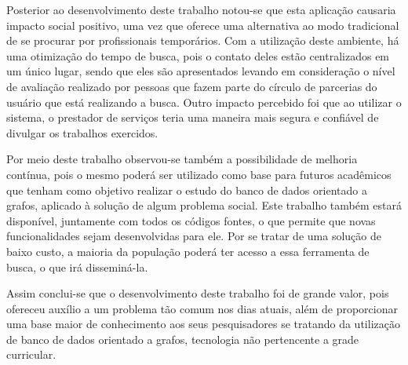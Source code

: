 \par Posterior ao desenvolvimento deste trabalho notou-se que esta aplicação causaria impacto social positivo, uma vez que oferece uma alternativa ao modo tradicional de se procurar por profissionais temporários. Com a utilização deste ambiente, há uma otimização do tempo de busca, pois o contato deles estão centralizados em um único lugar, sendo que eles são apresentados levando em consideração o nível de avaliação realizado por pessoas que fazem parte do círculo de parcerias do usuário que está realizando a busca. Outro impacto percebido foi que ao utilizar o sistema, o prestador de serviços teria uma maneira mais segura e confiável de divulgar os trabalhos exercidos.  

\par Por meio deste trabalho observou-se também a possibilidade de melhoria contínua, pois o mesmo poderá ser utilizado como base para futuros acadêmicos que tenham como objetivo realizar o estudo do banco de dados orientado a grafos, aplicado à solução de algum problema social. Este trabalho também estará disponível, juntamente com todos os códigos fontes, o que permite que novas funcionalidades sejam desenvolvidas para ele. Por se tratar de uma solução de baixo custo, a maioria da população poderá ter acesso a essa ferramenta de busca, o que irá disseminá-la.

\par Assim conclui-se que o desenvolvimento deste trabalho foi de grande valor, pois ofereceu auxílio a um problema tão comum nos dias atuais, além de proporcionar uma base maior de conhecimento aos seus pesquisadores se tratando da utilização de banco de dados orientado a grafos, tecnologia não pertencente a grade curricular.